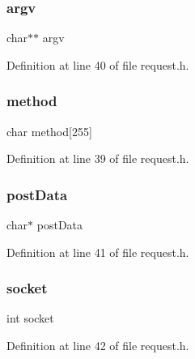 \subsubsection{\texorpdfstring{argv}{argv}}
{\footnotesize\ttfamily char$\ast$$\ast$ argv}



Definition at line 40 of file request.\+h.

\mbox{\label{struct__request_aa97bc4e02a581ea6bb8f7b704dc1169e}} 
\subsubsection{\texorpdfstring{method}{method}}
{\footnotesize\ttfamily char method\mbox{[}255\mbox{]}}



Definition at line 39 of file request.\+h.

\mbox{\label{struct__request_a085deaaceab1baf1c9408775106b2272}} 
\subsubsection{\texorpdfstring{post\+Data}{postData}}
{\footnotesize\ttfamily char$\ast$ post\+Data}



Definition at line 41 of file request.\+h.

\mbox{\label{struct__request_a3666576f6b88007cc7b8f26c7da596c8}} 
\subsubsection{\texorpdfstring{socket}{socket}}
{\footnotesize\ttfamily int socket}



Definition at line 42 of file request.\+h.

\mbox{\label{struct__request_ac30a6dcbeca564ac73913a3df8a821b9}} 
